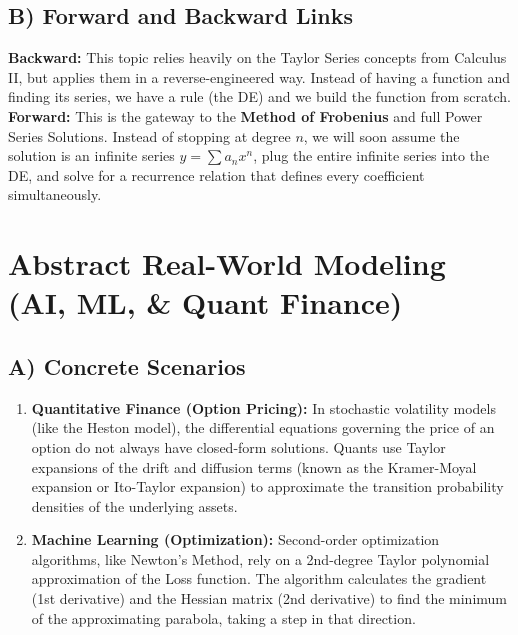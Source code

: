 \documentclass[11pt, letterpaper]{article}
\theoremstyle{definition}
\theoremstyle{remark}
\begin{document}
\subsection{B) Forward and Backward Links}
\textbf{Backward:} This topic relies heavily on the Taylor Series concepts from Calculus II, but applies them in a reverse-engineered way. Instead of having a function and finding its series, we have a rule (the DE) and we build the function from scratch.
\textbf{Forward:} This is the gateway to the \textbf{Method of Frobenius} and full Power Series Solutions. Instead of stopping at degree $n$, we will soon assume the solution is an infinite series $y = \sum a_n x^n$, plug the entire infinite series into the DE, and solve for a recurrence relation that defines every coefficient simultaneously.

\section{Abstract Real-World Modeling (AI, ML, \& Quant Finance)}

\subsection{A) Concrete Scenarios}
\begin{enumerate}
    \item \textbf{Quantitative Finance (Option Pricing):} In stochastic volatility models (like the Heston model), the differential equations governing the price of an option do not always have closed-form solutions. Quants use Taylor expansions of the drift and diffusion terms (known as the Kramer-Moyal expansion or Ito-Taylor expansion) to approximate the transition probability densities of the underlying assets.
    \item \textbf{Machine Learning (Optimization):} Second-order optimization algorithms, like Newton's Method, rely on a 2nd-degree Taylor polynomial approximation of the Loss function. The algorithm calculates the gradient (1st derivative) and the Hessian matrix (2nd derivative) to find the minimum of the approximating parabola, taking a step in that direction.
\end{enumerate}
\end{document}
